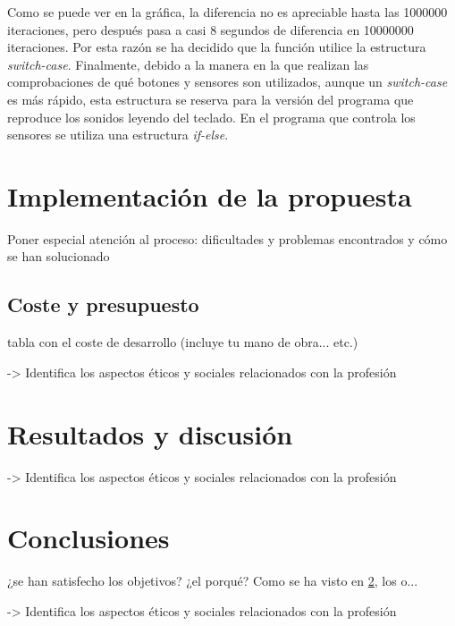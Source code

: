 \documentclass{article}
\begin{document}
    Como se puede ver en la gráfica, la diferencia no es apreciable hasta las 1000000 iteraciones, pero después
    pasa a casi 8 segundos de diferencia en 10000000 iteraciones. Por esta razón se ha decidido que la función
    utilice la estructura \textit{switch-case}.\newline
    Finalmente, debido a la manera en la que realizan las comprobaciones de qué botones y sensores son utilizados,
    aunque un \textit{switch-case} es más rápido, esta estructura se reserva para la versión del programa que
    reproduce los sonidos leyendo del teclado. En el programa que controla los sensores se utiliza una estructura
    \textit{if-else}.


\section{Implementación de la propuesta}\label{sec:Implementacion}

 Poner especial atención al proceso: dificultades y problemas encontrados y cómo se han solucionado

 \subsection{Coste y presupuesto}

  tabla con el coste de desarrollo (incluye tu mano de obra... etc.)

->  Identifica los aspectos éticos y sociales relacionados con la profesión

\section{Resultados y discusión}\label{sec:ResultadosDisc}

-> Identifica los aspectos éticos y sociales relacionados con la profesión


\section{Conclusiones}\label{sec:Conclusiones}

 ¿se han satisfecho los objetivos? ¿el porqué? Como se ha visto en \ref{sec:ResultadosDisc}, los o...

-> Identifica los aspectos éticos y sociales relacionados con la profesión




\end{document}
